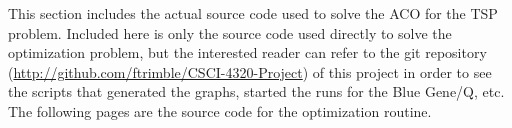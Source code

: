 \documentclass[twocolumn]{article}
\begin{document}
\nocite{*}



\begin{appendices}

This section includes the actual source code used to solve the ACO for the TSP 
problem. Included here is only the source code used directly to solve the optimization
problem, but the interested reader can refer to the git repository 
(\url{http://github.com/ftrimble/CSCI-4320-Project}) of this project
in order to see the scripts that generated the graphs, started the runs for the 
Blue Gene/Q, etc. The following pages are the source code for the optimization routine.

\onecolumn



\end{appendices}
\end{document}
